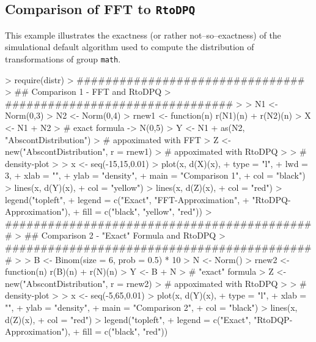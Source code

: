\documentclass[11pt]{article}
\begin{document}
\subsection{Comparison of FFT to {\tt RtoDPQ}}\label{compex}
\begin{small}
  This example illustrates the exactness (or rather not--so--exactness) of the 
  simulational default algorithm used to compute the distribution of 
  transformations of group {\tt math}.
\end{small}
\begin{Schunk}
\begin{Sinput}
> require(distr)
> ################################
> ## Comparison 1 - FFT and RtoDPQ 
> ################################
> 
> N1 <- Norm(0,3)
> N2 <- Norm(0,4)
> rnew1 <- function(n) r(N1)(n) + r(N2)(n) 
> X <- N1 + N2 
>      # exact formula -> N(0,5)
> Y <- N1 + as(N2, "AbscontDistribution") 
>      # appoximated with FFT
> Z <- new("AbscontDistribution", r = rnew1) 
>      # appoximated with RtoDPQ
> 
> # density-plot
> 
> x <- seq(-15,15,0.01)
> plot(x, d(X)(x),
+      type = "l",
+      lwd = 3,
+      xlab = "",
+      ylab = "density",
+      main = "Comparison 1",     
+      col = "black")
> lines(x, d(Y)(x),
+      col = "yellow")
> lines(x, d(Z)(x),
+      col = "red")
> legend("topleft",
+   legend = c("Exact", "FFT-Approximation", 
+              "RtoDPQ-Approximation"),
+        fill = c("black", "yellow", "red"))
> ############################################
> ## Comparison 2 - "Exact" Formula and RtoDPQ
> ############################################
> 
> B <- Binom(size = 6, prob = 0.5) * 10
> N <- Norm()
> rnew2 <- function(n) r(B)(n) + r(N)(n)
> Y <- B + N 
>      # "exact" formula
> Z <- new("AbscontDistribution", r = rnew2) 
>      # appoximated with RtoDPQ
> 
> # density-plot
> 
> x  <- seq(-5,65,0.01)
> plot(x, d(Y)(x),
+      type = "l",
+      xlab = "",
+      ylab = "density",
+      main = "Comparison 2",
+      col = "black")
> lines(x, d(Z)(x),
+      col = "red")
> legend("topleft",
+        legend = c("Exact", "RtoDQP-Approximation"),
+        fill = c("black", "red"))
\end{Sinput}
\end{Schunk}
\end{document}
